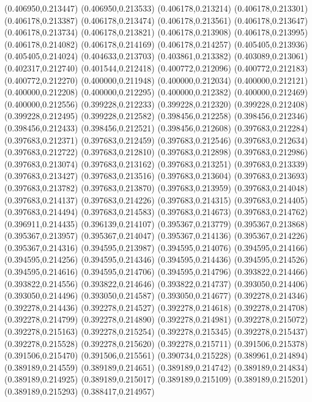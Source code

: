 (0.406950,0.213447)
(0.406950,0.213533)
(0.406178,0.213214)
(0.406178,0.213301)
(0.406178,0.213387)
(0.406178,0.213474)
(0.406178,0.213561)
(0.406178,0.213647)
(0.406178,0.213734)
(0.406178,0.213821)
(0.406178,0.213908)
(0.406178,0.213995)
(0.406178,0.214082)
(0.406178,0.214169)
(0.406178,0.214257)
(0.405405,0.213936)
(0.405405,0.214024)
(0.404633,0.213703)
(0.403861,0.213382)
(0.403089,0.213061)
(0.402317,0.212740)
(0.401544,0.212418)
(0.400772,0.212096)
(0.400772,0.212183)
(0.400772,0.212270)
(0.400000,0.211948)
(0.400000,0.212034)
(0.400000,0.212121)
(0.400000,0.212208)
(0.400000,0.212295)
(0.400000,0.212382)
(0.400000,0.212469)
(0.400000,0.212556)
(0.399228,0.212233)
(0.399228,0.212320)
(0.399228,0.212408)
(0.399228,0.212495)
(0.399228,0.212582)
(0.398456,0.212258)
(0.398456,0.212346)
(0.398456,0.212433)
(0.398456,0.212521)
(0.398456,0.212608)
(0.397683,0.212284)
(0.397683,0.212371)
(0.397683,0.212459)
(0.397683,0.212546)
(0.397683,0.212634)
(0.397683,0.212722)
(0.397683,0.212810)
(0.397683,0.212898)
(0.397683,0.212986)
(0.397683,0.213074)
(0.397683,0.213162)
(0.397683,0.213251)
(0.397683,0.213339)
(0.397683,0.213427)
(0.397683,0.213516)
(0.397683,0.213604)
(0.397683,0.213693)
(0.397683,0.213782)
(0.397683,0.213870)
(0.397683,0.213959)
(0.397683,0.214048)
(0.397683,0.214137)
(0.397683,0.214226)
(0.397683,0.214315)
(0.397683,0.214405)
(0.397683,0.214494)
(0.397683,0.214583)
(0.397683,0.214673)
(0.397683,0.214762)
(0.396911,0.214435)
(0.396139,0.214107)
(0.395367,0.213779)
(0.395367,0.213868)
(0.395367,0.213957)
(0.395367,0.214047)
(0.395367,0.214136)
(0.395367,0.214226)
(0.395367,0.214316)
(0.394595,0.213987)
(0.394595,0.214076)
(0.394595,0.214166)
(0.394595,0.214256)
(0.394595,0.214346)
(0.394595,0.214436)
(0.394595,0.214526)
(0.394595,0.214616)
(0.394595,0.214706)
(0.394595,0.214796)
(0.393822,0.214466)
(0.393822,0.214556)
(0.393822,0.214646)
(0.393822,0.214737)
(0.393050,0.214406)
(0.393050,0.214496)
(0.393050,0.214587)
(0.393050,0.214677)
(0.392278,0.214346)
(0.392278,0.214436)
(0.392278,0.214527)
(0.392278,0.214618)
(0.392278,0.214708)
(0.392278,0.214799)
(0.392278,0.214890)
(0.392278,0.214981)
(0.392278,0.215072)
(0.392278,0.215163)
(0.392278,0.215254)
(0.392278,0.215345)
(0.392278,0.215437)
(0.392278,0.215528)
(0.392278,0.215620)
(0.392278,0.215711)
(0.391506,0.215378)
(0.391506,0.215470)
(0.391506,0.215561)
(0.390734,0.215228)
(0.389961,0.214894)
(0.389189,0.214559)
(0.389189,0.214651)
(0.389189,0.214742)
(0.389189,0.214834)
(0.389189,0.214925)
(0.389189,0.215017)
(0.389189,0.215109)
(0.389189,0.215201)
(0.389189,0.215293)
(0.388417,0.214957)
